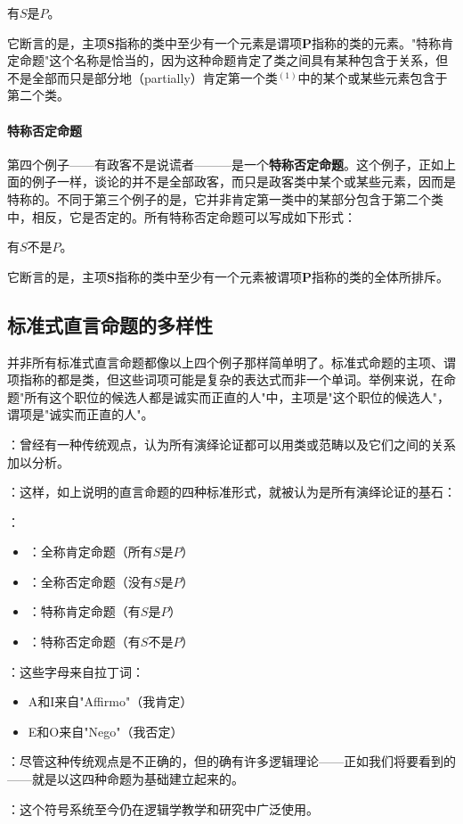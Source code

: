 有$S$是$P$。

它断言的是，主项$\boldsymbol{S}$指称的类中至少有一个元素是谓项$\boldsymbol{P}$指称的类的元素。"特称肯定命题"这个名称是恰当的，因为这种命题肯定了类之间具有某种包含于关系，但不是全部而只是部分地（partially）肯定第一个类${ }^{(1)}$中的某个或某些元素包含于第二个类。

\paragraph{特称否定命题}
第四个例子——有政客不是说谎者———是一个\textbf{特称否定命题}。这个例子，正如上面的例子一样，谈论的并不是全部政客，而只是政客类中某个或某些元素，因而是特称的。不同于第三个例子的是，它并非肯定第一类中的某部分包含于第二个类中，相反，它是否定的。所有特称否定命题可以写成如下形式：

有$S$不是$P$。

它断言的是，主项$\boldsymbol{S}$指称的类中至少有一个元素被谓项$\boldsymbol{P}$指称的类的全体所排斥。

\subsection{标准式直言命题的多样性}

并非所有标准式直言命题都像以上四个例子那样简单明了。标准式命题的主项、谓项指称的都是类，但这些词项可能是复杂的表达式而非一个单词。举例来说，在命题"所有这个职位的候选人都是诚实而正直的人"中，主项是"这个职位的候选人"，谓项是"诚实而正直的人"。

\begin{theorembox}[title=直言命题的传统符号系统]
：曾经有一种传统观点，认为所有演绎论证都可以用类或范畴以及它们之间的关系加以分析。

：这样，如上说明的直言命题的四种标准形式，就被认为是所有演绎论证的基石：

：
\begin{itemize}
  \item {}：全称肯定命题（所有$S$是$P$）
  \item {}：全称否定命题（没有$S$是$P$）
  \item {}：特称肯定命题（有$S$是$P$）
  \item {}：特称否定命题（有$S$不是$P$）
\end{itemize}

：这些字母来自拉丁词：
\begin{itemize}
  \item A和I来自"Affirmo"（我肯定）
  \item E和O来自"Nego"（我否定）
\end{itemize}

：尽管这种传统观点是不正确的，但的确有许多逻辑理论——正如我们将要看到的——就是以这四种命题为基础建立起来的。

：这个符号系统至今仍在逻辑学教学和研究中广泛使用。
\end{theorembox}

